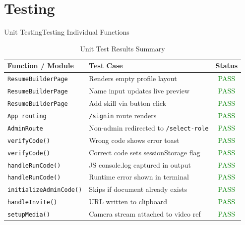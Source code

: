 \documentclass{beamer}
\begin{document}
\section{Testing}
\begin{frame}{Unit Testing}{Testing Individual Functions}
\scriptsize
\begin{table}
\centering
\begin{tabular}{|p{3cm}|p{4cm}|c|}
\hline
\textbf{Function / Module} & \textbf{Test Case} & \textbf{Status} \\ \hline
\texttt{ResumeBuilderPage} & Renders empty profile layout & \textcolor{green}{PASS} \\ \hline
\texttt{ResumeBuilderPage} & Name input updates live preview & \textcolor{green}{PASS} \\ \hline
\texttt{ResumeBuilderPage} & Add skill via button click & \textcolor{green}{PASS} \\ \hline
\texttt{App routing} & \texttt{/signin} route renders & \textcolor{green}{PASS} \\ \hline
\texttt{AdminRoute} & Non-admin redirected to \texttt{/select-role} & \textcolor{green}{PASS} \\ \hline
\texttt{verifyCode()} & Wrong code shows error toast & \textcolor{green}{PASS} \\ \hline
\texttt{verifyCode()} & Correct code sets sessionStorage flag & \textcolor{green}{PASS} \\ \hline
\texttt{handleRunCode()} & JS console.log captured in output & \textcolor{green}{PASS} \\ \hline
\texttt{handleRunCode()} & Runtime error shown in terminal & \textcolor{green}{PASS} \\ \hline
\texttt{initializeAdminCode()} & Skips if document already exists & \textcolor{green}{PASS} \\ \hline
\texttt{handleInvite()} & URL written to clipboard & \textcolor{green}{PASS} \\ \hline
\texttt{setupMedia()} & Camera stream attached to video ref & \textcolor{green}{PASS} \\ \hline
\end{tabular}
\caption{Unit Test Results Summary}
\end{table}
\end{frame}
\end{document}
